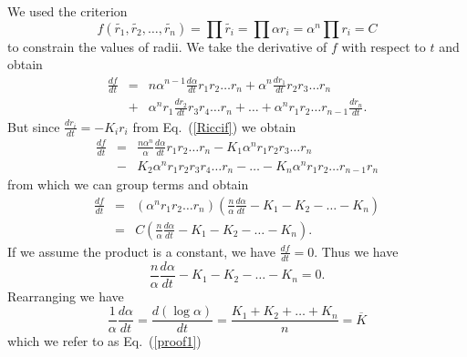 \documentclass[12pt]{article}
\begin{document}
	We used the criterion $$f(\tilde{r_1},\tilde{r_2},\ldots,\tilde{r_n}) = \prod{\tilde{r_i}} = \prod{\alpha r_i} = \alpha^n\prod{r_i}= C$$ to constrain the values of radii. We take the derivative of $f$ with respect to $t$ and obtain
	\begin{eqnarray*}
	\frac{df}{dt} & = & n\alpha^{n-1}\frac{d\alpha}{dt}r_1r_2\ldots r_n + \alpha^n\frac{dr_1}{dt}r_2r_3\ldots r_n\\
								& + & \alpha^nr_1\frac{dr_2}{dt}r_3r_4\ldots r_n + \ldots + \alpha^nr_1r_2\ldots r_{n-1}\frac{dr_n}{dt}.
	\end{eqnarray*}
	But since $\displaystyle \frac{dr_i}{dt} = -K_ir_i$ from Eq.~(\ref{Riccif}) we obtain
	\begin{eqnarray*}
	\frac{df}{dt} & = & \frac{n\alpha^{n}}{\alpha}\frac{d\alpha}{dt}r_1r_2\ldots r_n - K_1\alpha^nr_1r_2r_3\ldots r_n\\
								& - & K_2\alpha^nr_1r_2r_3r_4\ldots r_n - \ldots - K_n\alpha^nr_1r_2\ldots r_{n-1}r_n
	\end{eqnarray*}
	from which we can group terms and obtain
	\begin{eqnarray*}
	\frac{df}{dt} & = & (\alpha^nr_1r_2\ldots r_n)(\frac{n}{\alpha}\frac{d\alpha}{dt} - K_1 - K_2 - \ldots - K_n)\\
								& = & C(\frac{n}{\alpha}\frac{d\alpha}{dt} - K_1 - K_2 - \ldots - K_n).
	\end{eqnarray*}
	If we assume the product is a constant, we have $\displaystyle \frac{df}{dt} = 0.$ Thus we have $$\frac{n}{\alpha}\frac{d\alpha}{dt} - K_1 - K_2 - \ldots - K_n = 0.$$
	Rearranging we have
$$\frac{1}{\alpha}\frac{d\alpha}{dt} = \frac{d(\log \alpha)}{dt} = \frac{K_1 + K_2 + \ldots + K_n}{n} = \overline{K}$$
	which we refer to as Eq.~(\ref{proof1})
  
\end{document}
